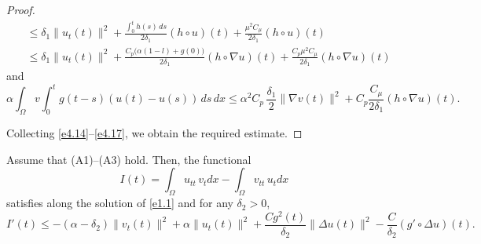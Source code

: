\documentclass[reqno]{amsart}
\begin{document}
\begin{proof}
\begin{equation}
\begin{aligned}
&\leq \delta_{1} \| u_t(t) \|^2+ \frac{ \int_0^{t} h(s) \, ds }{2\delta_{1}}
 (h \circ u)(t)+ \frac{\mu^2 C_\mu }{2\delta_{1}} (h \circ u)(t)\\
&\leq \delta_{1} \| u_t(t) \|^2+ \frac{C_p \big(\alpha(1-l)+g(0)\big)}{2\delta_{1}}
 (h \circ \nabla u)(t)+ \frac{C_p\mu^2 C_\mu }{2\delta_{1}} (h \circ \nabla u)(t)
\end{aligned} \label{e4.16}
\end{equation}
and
\begin{equation}
 \alpha \int_{\Omega} v  \int_0^t g(t - s)(u(t) - u(s)) \, ds \, dx
 \leq \alpha^2 C_p \,\frac{\delta_{1}}{2} \| \nabla v(t) \|^2
 + C_p \frac{ C_\mu}{ 2 \delta_{1}} (h \circ \nabla u)(t).\label{e4.17}
\end{equation}

Collecting  \eqref{e4.14}--\eqref{e4.17}, we obtain the required estimate.
\end{proof}

\begin{lemma} \label{lem9}
Assume that {\rm (A1)--(A3)} hold. Then, the functional
\begin{equation*}
 I(t) = \int_{\Omega} u_{tt} \, v_t dx - \int_{\Omega} v_{tt} \, u_t dx
 \end{equation*}
 satisfies along the solution of \eqref{e1.1} and for any $\delta_2>0$,
 \begin{equation}
 I'(t) \leq - ( \alpha- \delta_2) \| v_t (t) \|^2+ \alpha \| u_t (t) \|^2
 + \frac{C g^2(t)}{\delta_2} \| \Delta u(t) \|^2-\frac{C}{ \delta_2}
 (g' \circ \Delta u)(t). \label{e4.18}
\end{equation}
\end{lemma}
\end{document}

